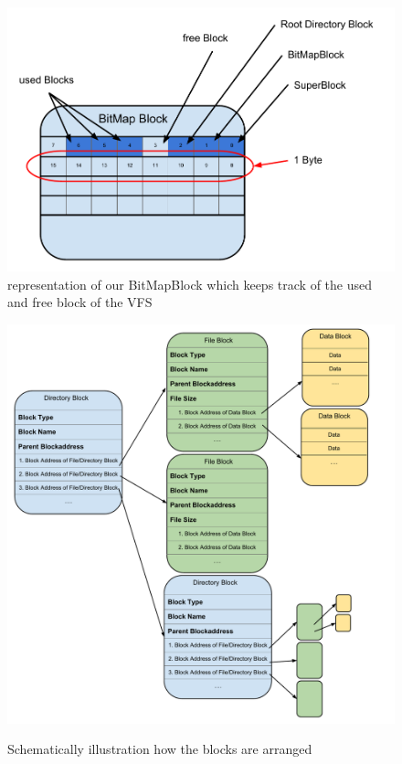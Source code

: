 \documentclass[a4paper,12pt]{article}
\begin{document}
\begin{figure}[h]
\begin{center}
\includegraphics[scale=0.5]{images/BitMapBlock.pdf}
\caption{representation of our BitMapBlock which keeps track of the used and free block of the VFS}
\label{bitmapblock}

\end{center}
\end{figure}


\begin{figure}[h]
\begin{center}
\includegraphics[scale=0.3]{images/Blocks.pdf}
\label{blocks}
\caption{Schematically illustration how the blocks are arranged}
\end{center}
\end{figure}
\end{document}
